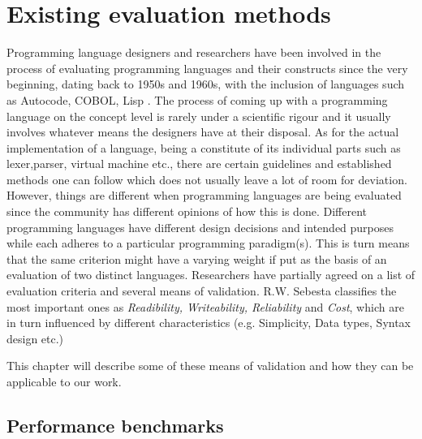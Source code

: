 \chapter{Existing evaluation methods}
\label{chap:eval_methods}

Programming language designers and researchers have been involved in the process of evaluating programming languages and their constructs since the very beginning, dating back to 1950s and 1960s, with the inclusion of languages such as Autocode, COBOL, Lisp \cite{PLHistory}. The process of coming up with a programming language on the concept level is rarely under a scientific rigour and it usually involves whatever means the designers have at their disposal. As for the actual implementation of a language, being a constitute of its individual parts such as lexer,parser, virtual machine etc., there are certain guidelines and established methods one can follow which does not usually leave a lot of room for deviation. However, things are different when programming languages are being evaluated since the community has different opinions of how this is done. Different programming languages have different design decisions and intended purposes while each adheres to a particular programming paradigm(s). This is turn means that the same criterion might have a varying weight if put as the basis of an evaluation of two distinct languages. Researchers have partially agreed on a list of evaluation criteria and several means of validation. R.W. Sebesta \cite{Sebesta} classifies the most important ones as \textit{Readibility, Writeability, Reliability} and \textit{Cost}, which are in turn influenced by different characteristics (e.g. Simplicity, Data types, Syntax design etc.) 

This chapter will describe some of these means of validation and how they can be applicable to our work.

\section{Performance benchmarks}

